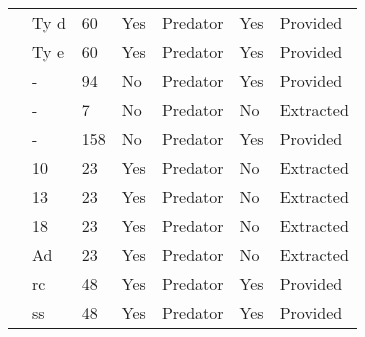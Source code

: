 \begin{table}[!tbp]
\begin{center}
\begin{tabular}{lllllll}
\citet{Lester:2002aa}&Ty d&60&Yes&Predator&Yes&Provided\tabularnewline
\citet{Lester:2002aa}&Ty e&60&Yes&Predator&Yes&Provided\tabularnewline
\citet{Long:2012ab}&-&94&No&Predator&Yes&Provided\tabularnewline
\citet{Mattila:1998aa}&-&7&No&Predator&No&Extracted\tabularnewline
\citet{Nachappa:2006aa}&-&158&No&Predator&Yes&Provided\tabularnewline
\citet{Ranta:1985aa}&10&23&Yes&Predator&No&Extracted\tabularnewline
\citet{Ranta:1985aa}&13&23&Yes&Predator&No&Extracted\tabularnewline
\citet{Ranta:1985aa}&18&23&Yes&Predator&No&Extracted\tabularnewline
\citet{Ranta:1985aa}&Ad&23&Yes&Predator&No&Extracted\tabularnewline
\citet{Wong:2005aa}&rc&48&Yes&Predator&Yes&Provided\tabularnewline
\citet{Wong:2005aa}&ss&48&Yes&Predator&Yes&Provided\tabularnewline
\hline
\end{tabular}\end{center}
\end{table}
